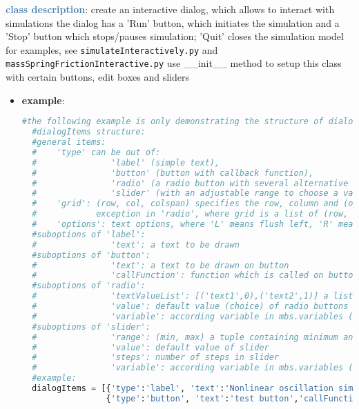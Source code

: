 \begin{itemize}[leftmargin=1.4cm]
\begin{itemize}[leftmargin=1.4cm]
\begin{itemize}[leftmargin=1.4cm]
\begin{itemize}[leftmargin=0.5cm]
\begin{itemize}[leftmargin=1.4cm]
\begin{itemize}[leftmargin=1.4cm]
\begin{itemize}[leftmargin=0.5cm]
\begin{itemize}[leftmargin=1.4cm]
\begin{itemize}[leftmargin=1.4cm]
\begin{itemize}[leftmargin=0.5cm]
\begin{itemize}[leftmargin=1.4cm]
\begin{itemize}[leftmargin=1.4cm]
\ei
{}
\noindent\textcolor{steelblue}{{\bf class description}}:  create an interactive dialog, which allows to interact with simulations
the dialog has a 'Run' button, which initiates the simulation and a 'Stop' button which stops/pauses simulation; 'Quit' closes the simulation model
for examples, see \texttt{simulateInteractively.py} and \texttt{massSpringFrictionInteractive.py}
use \_\_init\_\_ method to setup this class with certain buttons, edit boxes and sliders
\setlength{\itemindent}{0.7cm}
\begin{itemize}[leftmargin=0.7cm]
\item[--]
{\bf example}: \vspace{-12pt}\ei\begin{lstlisting}[language=Python, xleftmargin=36pt]
  #the following example is only demonstrating the structure of dialogItems and plots
  #dialogItems structure:
  #general items:
  #    'type' can be out of:
  #               'label' (simple text),
  #               'button' (button with callback function),
  #               'radio' (a radio button with several alternative options),
  #               'slider' (with an adjustable range to choose a value)
  #    'grid': (row, col, colspan) specifies the row, column and (optionally) the span of columns the item is placed at;
  #            exception in 'radio', where grid is a list of (row, col) for every choice
  #    'options': text options, where 'L' means flush left, 'R' means flush right
  #suboptions of 'label':
  #               'text': a text to be drawn
  #suboptions of 'button':
  #               'text': a text to be drawn on button
  #               'callFunction': function which is called on button-press
  #suboptions of 'radio':
  #               'textValueList': [('text1',0),('text2',1)] a list of texts with according values
  #               'value': default value (choice) of radio buttons
  #               'variable': according variable in mbs.variables (or mbs.sys), which is set to current radio button value
  #suboptions of 'slider':
  #               'range': (min, max) a tuple containing minimum and maximum value of slider
  #               'value': default value of slider
  #               'steps': number of steps in slider
  #               'variable': according variable in mbs.variables (or mbs.sys), which is set to current slider value
  #example:
  dialogItems = [{'type':'label', 'text':'Nonlinear oscillation simulator', 'grid':(0,0,2), 'options':['L']},
                 {'type':'button', 'text':'test button','callFunction':ButtonCall, 'grid':(1,0,2)},

\end{lstlisting}
\end{itemize}
\end{itemize}
\end{itemize}
\end{itemize}
\end{itemize}
\end{itemize}
\end{itemize}
\end{itemize}
\end{itemize}
\end{itemize}
\end{itemize}
\end{itemize}
\end{itemize}
